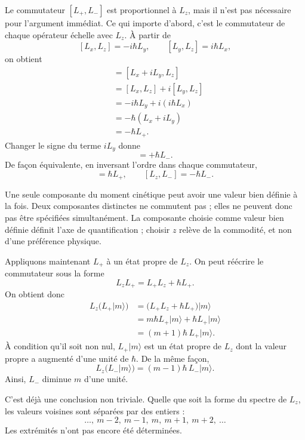 Le commutateur \([L_+,L_-]\) est proportionnel à \(L_z\), mais il n’est pas nécessaire pour l’argument immédiat. Ce qui importe d’abord, c’est le commutateur de chaque opérateur échelle avec \(L_z\). À partir de
\[
[L_x,L_z]=-i\hbar L_y,
\qquad
[L_y,L_z]=i\hbar L_x,
\]
on obtient
\begin{align}
[L_+,L_z]
&=[L_x+iL_y,L_z] \\
&=[L_x,L_z]+i[L_y,L_z] \\
&=-i\hbar L_y+i(i\hbar L_x) \\
&=-\hbar(L_x+iL_y) \\
&=-\hbar L_+.
\end{align}
Changer le signe du terme \(iL_y\) donne
\begin{equation}
[L_-,L_z]=+\hbar L_-.
\end{equation}
De façon équivalente, en inversant l’ordre dans chaque commutateur,
\begin{equation}
[L_z,L_+]=\hbar L_+,
\qquad
[L_z,L_-]=-\hbar L_-.
\end{equation}

Une seule composante du moment cinétique peut avoir une valeur bien définie à la fois. Deux composantes distinctes ne commutent pas ; elles ne peuvent donc pas être spécifiées simultanément. La composante choisie comme valeur bien définie définit l’axe de quantification ; choisir \(z\) relève de la commodité, et non d’une préférence physique.

Appliquons maintenant \(L_+\) à un état propre de \(L_z\). On peut réécrire le commutateur sous la forme
\begin{equation}
L_zL_+=L_+L_z+\hbar L_+.
\end{equation}
On obtient donc
\begin{align}
L_z\bigl(L_+\lvert m\rangle\bigr)
&=\bigl(L_+L_z+\hbar L_+\bigr)\lvert m\rangle \\
&=m\hbar L_+\lvert m\rangle+\hbar L_+\lvert m\rangle \\
&=(m+1)\hbar\,L_+\lvert m\rangle.
\end{align}
À condition qu’il soit non nul, \(L_+\lvert m\rangle\) est un état propre de \(L_z\) dont la valeur propre a augmenté d’une unité de \(\hbar\). De la même façon,
\begin{equation}
L_z\bigl(L_-\lvert m\rangle\bigr)
=(m-1)\hbar\,L_-\lvert m\rangle.
\end{equation}
Ainsi, \(L_-\) diminue \(m\) d’une unité.

C’est déjà une conclusion non triviale. Quelle que soit la forme du spectre de \(L_z\), les valeurs voisines sont séparées par des entiers :
\begin{equation}
\ldots,\ m-2,\ m-1,\ m,\ m+1,\ m+2,\ \ldots
\end{equation}
Les extrémités n’ont pas encore été déterminées.


